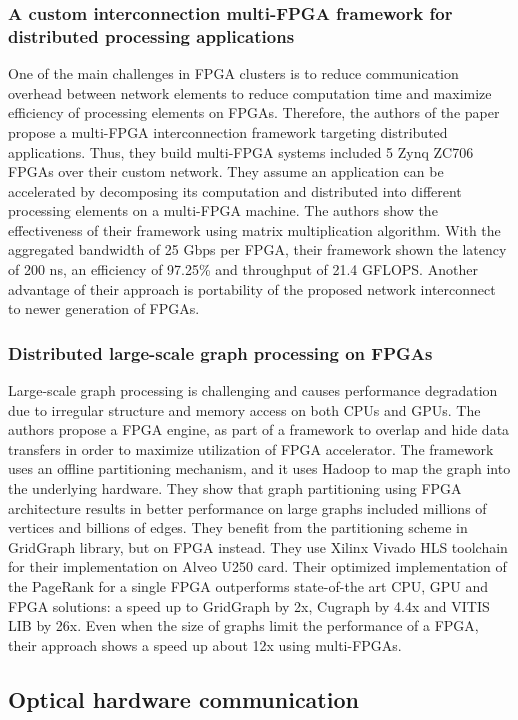 \subsubsection{A custom interconnection multi-FPGA framework for distributed processing applications}
One of the main challenges in FPGA clusters is to reduce communication overhead between network elements to reduce computation time and maximize efficiency of processing elements on FPGAs. Therefore, the authors of the paper propose a multi-FPGA interconnection framework targeting distributed applications. Thus, they build multi-FPGA systems included 5 Zynq ZC706 FPGAs over their custom network. They assume an application can be accelerated by decomposing its computation and distributed into different processing elements on a multi-FPGA machine. The authors show the effectiveness of their framework using matrix multiplication algorithm. With the aggregated bandwidth of 25 Gbps per FPGA, their framework shown the latency of 200 ns, an efficiency of 97.25\% and throughput of 21.4 GFLOPS. Another advantage of their approach is portability of the proposed network interconnect to newer generation of FPGAs.

\subsubsection{Distributed large-scale graph processing on FPGAs}
Large-scale graph processing is challenging and causes performance degradation due to irregular structure and memory access on both CPUs and GPUs. The authors propose a FPGA engine, as part of a framework to overlap and hide data transfers in order to maximize utilization of FPGA accelerator. The framework uses an offline partitioning mechanism, and it uses Hadoop to map the graph into the underlying hardware. They show that graph partitioning using FPGA architecture results in better performance on large graphs included millions of vertices and billions of edges. They benefit from the partitioning scheme in GridGraph library, but on FPGA instead. They use Xilinx Vivado HLS toolchain for their implementation on Alveo U250 card. Their optimized implementation of the PageRank for a single FPGA outperforms state-of-the art CPU, GPU and FPGA solutions: a speed up to GridGraph by 2x, Cugraph by 4.4x and VITIS LIB by 26x. Even when the size of graphs limit the performance of a FPGA, their approach shows a speed up about 12x using multi-FPGAs. 
\fi
\subsection{Optical hardware communication}
\label{opthwcom}

